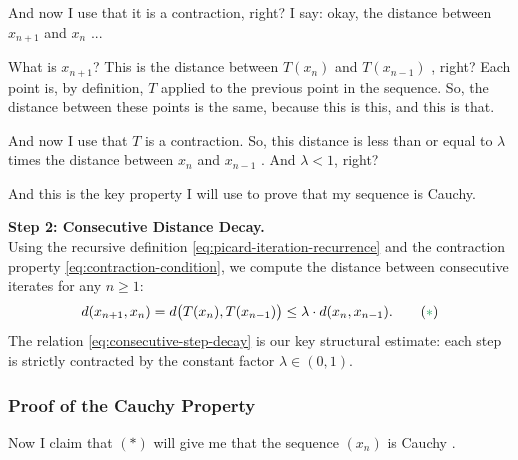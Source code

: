 \begin{proofWrapper}
\begin{speech}[00:26:36 - 00:28:27]
And now I use that it is a contraction, right? I say: okay, the distance between $x_{n+1}$ and $x_n$ ...

What is $x_{n+1}$? This is the distance between $T(x_n)$ and $T(x_{n-1})$ , right? Each point is, by definition, $T$ applied to the previous point in the sequence. So, the distance between these points is the same, because this is this, and this is that.

And now I use that $T$ is a contraction. So, this distance is less than or equal to $\lambda$ times the distance between $x_n$ and $x_{n-1}$ . And $\lambda < 1$, right?

 And this is the key property I will use to prove that my sequence is Cauchy. 
\end{speech}

\begin{content}
\textbf{Step 2: Consecutive Distance Decay.} \\
Using the recursive definition \eqref{eq:picard-iteration-recurrence} and the contraction property \eqref{eq:contraction-condition}, we compute the distance between consecutive iterates for any $n \ge 1$:
\begin{equation}\label{eq:consecutive-step-decay}
d(x_{n+1}, x_n) = d\bigl(T(x_n), T(x_{n-1})\bigr) \le \lambda \cdot d(x_n, x_{n-1}). \tag{\textcolor{ForestGreen}{$\ast$}}
\end{equation}
The relation \eqref{eq:consecutive-step-decay} is our key structural estimate: each step is strictly contracted by the constant factor $\lambda \in (0, 1)$.
\end{content}

\subsubsection{Proof of the Cauchy Property}

\begin{speech}[00:28:27 - 00:30:11]
Now I claim that $(*)$  will give me that the sequence $(x_n)$ is Cauchy .


\end{speech}
\end{proofWrapper}
